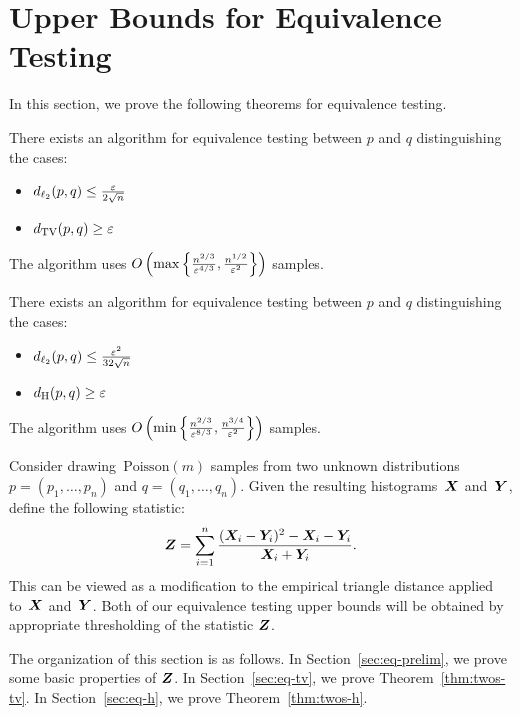 \section{Upper Bounds for Equivalence Testing}
\label{sec:twos-ub}
In this section, we prove the following theorems for equivalence testing.

\begin{theorem}\label{thm:twos-tv}
There exists an algorithm for equivalence testing between $p$ and $q$ distinguishing the cases:
\begin{itemize}
\item $d_{\ell_2}(p,q) \leq \frac{\varepsilon}{2\sqrt{n}}$ 
\item $d_{\mathrm {TV}}(p,q) \geq \varepsilon$
\end{itemize}
The algorithm uses $O\left(\max\left\{\frac{n^{2/3}}{\varepsilon^{4/3}}, \frac{n^{1/2}}{\varepsilon^2}\right\}\right)$ samples.
\end{theorem}

\begin{theorem}\label{thm:twos-h}
There exists an algorithm for equivalence testing between $p$ and $q$ distinguishing the cases:
\begin{itemize}
\item $d_{\ell_2}(p,q) \leq \frac{\varepsilon^2}{32\sqrt{n}}$ 
\item $d_{\mathrm {H}}(p,q) \geq \varepsilon$
\end{itemize}
The algorithm uses $O\left(\min\left\{\frac{n^{2/3}}{\varepsilon^{8/3}}, \frac{n^{3/4}}{\varepsilon^2}\right\}\right)$ samples.
\end{theorem}



Consider drawing~$\mathrm{Poisson}(m)$ samples from two unknown distributions $p = (p_1, \ldots, p_n)$ and $q = (q_1, \ldots, q_n)$.
Given the resulting histograms~$\boldsymbol{X}$ and~$\boldsymbol{Y}$, \cite{ChanDVV14} define the following statistic:
\begin{equation}\label{eq:hel-statistic}
\boldsymbol{Z} = \sum_{i=1}^n \frac{(\boldsymbol{X}_i - \boldsymbol{Y}_i)^2 - \boldsymbol{X}_i - \boldsymbol{Y}_i}{\boldsymbol{X}_i + \boldsymbol{Y}_i}.
\end{equation}
This can be viewed as a modification to the empirical triangle distance applied to~$\boldsymbol{X}$ and~$\boldsymbol{Y}$.
Both of our equivalence testing upper bounds will be obtained by appropriate thresholding of the statistic $\boldsymbol{Z}$.

The organization of this section is as follows.
In Section~\ref{sec:eq-prelim}, we prove some basic properties of $\boldsymbol{Z}$.
In Section~\ref{sec:eq-tv}, we prove Theorem~\ref{thm:twos-tv}.
In Section~\ref{sec:eq-h}, we prove Theorem~\ref{thm:twos-h}.

